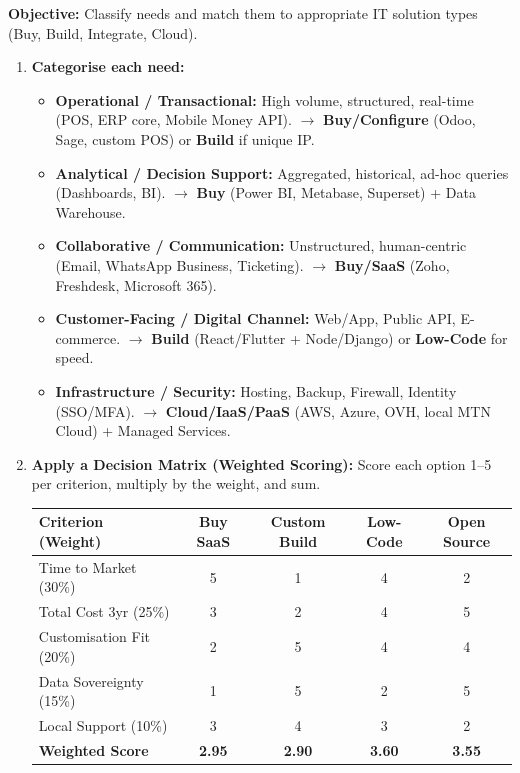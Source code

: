 \documentclass[11pt]{article}
\begin{document}
\begin{methode}
\textbf{Objective:} Classify needs and match them to appropriate IT solution types (Buy, Build, Integrate, Cloud).
\begin{enumerate}
    \item \textbf{Categorise each need:}
    \begin{itemize}
        \item \textbf{Operational / Transactional:} High volume, structured, real-time (POS, ERP core, Mobile Money API). $\to$ \textbf{Buy/Configure} (Odoo, Sage, custom POS) or \textbf{Build} if unique IP.
        \item \textbf{Analytical / Decision Support:} Aggregated, historical, ad-hoc queries (Dashboards, BI). $\to$ \textbf{Buy} (Power BI, Metabase, Superset) + Data Warehouse.
        \item \textbf{Collaborative / Communication:} Unstructured, human-centric (Email, WhatsApp Business, Ticketing). $\to$ \textbf{Buy/SaaS} (Zoho, Freshdesk, Microsoft 365).
        \item \textbf{Customer-Facing / Digital Channel:} Web/App, Public API, E-commerce. $\to$ \textbf{Build} (React/Flutter + Node/Django) or \textbf{Low-Code} for speed.
        \item \textbf{Infrastructure / Security:} Hosting, Backup, Firewall, Identity (SSO/MFA). $\to$ \textbf{Cloud/IaaS/PaaS} (AWS, Azure, OVH, local MTN Cloud) + Managed Services.
    \end{itemize}
    \item \textbf{Apply a Decision Matrix (Weighted Scoring):} Score each option 1--5 per criterion, multiply by the weight, and sum.
    \begin{center}
    \begin{tabularx}{\linewidth}{|X|c|c|c|c|}\hline
    \rowcolor{popblueL} \textbf{Criterion (Weight)} & \textbf{Buy SaaS} & \textbf{Custom Build} & \textbf{Low-Code} & \textbf{Open Source} \\ \hline
    Time to Market (30\%) & 5 & 1 & 4 & 2 \\ \hline
    Total Cost 3yr (25\%) & 3 & 2 & 4 & 5 \\ \hline
    Customisation Fit (20\%) & 2 & 5 & 4 & 4 \\ \hline
    Data Sovereignty (15\%) & 1 & 5 & 2 & 5 \\ \hline
    Local Support (10\%) & 3 & 4 & 3 & 2 \\ \hline
    \textbf{Weighted Score} & \textbf{2.95} & \textbf{2.90} & \textbf{3.60} & \textbf{3.55} \\ \hline

\end{tabularx}
\end{center}
\end{enumerate}
\end{methode}
\end{document}
